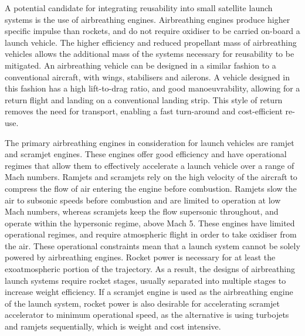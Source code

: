  	A potential candidate for integrating reusability into small satellite launch systems is the use of airbreathing engines\cite{Smart2009a,Ketsdever2010}.
Airbreathing engines produce higher specific impulse than rockets, and do not require oxidiser to be carried on-board a launch vehicle\cite{Smart2010}.  	 
  	The higher efficiency and reduced propellant mass of airbreathing vehicles allows the additional mass of the systems necessary for reusability to be mitigated\cite{Curran2003}. An airbreathing vehicle can be designed in a similar fashion to a conventional aircraft, with wings, stabilisers and ailerons\cite{Shaughnessy1990,Preller2017b}. A vehicle designed in this fashion has a high lift-to-drag ratio, and good manoeuvrability, allowing for a return flight and landing on a conventional landing strip\cite{Preller2017b}. This style of return removes the need for transport, enabling a fast turn-around and cost-efficient re-use. 
  	
  	The primary airbreathing engines in consideration for launch vehicles are ramjet and scramjet engines\cite{HeiserWilliamPratt1994}. These engines offer good efficiency and have operational regimes that allow them to effectively accelerate a launch vehicle over a range of Mach numbers. 
  	Ramjets and scramjets rely on the high velocity of the aircraft to compress the flow of air entering the engine before combustion.  Ramjets slow the air to subsonic speeds before combustion and are limited to operation at low Mach numbers, whereas scramjets keep the flow supersonic throughout, and operate within the hypersonic regime, above Mach 5. 
  	These engines have limited operational regimes, and require atmospheric flight in order to take oxidiser from the air. These operational constraints mean that a launch system cannot be solely powered by airbreathing engines. Rocket power is necessary for at least the exoatmospheric portion of the trajectory. As a result, the designs of airbreathing launch systems require rocket stages, usually separated into multiple stages to increase weight efficiency\cite{Smart2009a}. If a scramjet engine is used as the airbreathing engine of the launch system, rocket power is also desirable for accelerating scramjet accelerator to minimum operational speed, as the alternative is using turbojets and ramjets sequentially\cite{Smart2009a}, which is weight and cost intensive. 
  	
  	 
  	 
